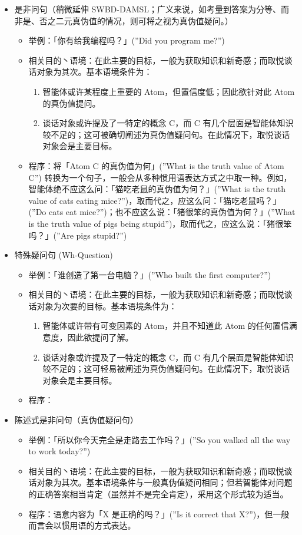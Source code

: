 \begin{itemize}


\item 是非问句（稍微延伸 SWBD-DAMSL；广义来说，如考量到答案为分等、而非是、否之二元真伪值的情况，则可将之视为真伪值疑问。）
\begin{itemize}
\item 举例：「你有给我编程吗？」(”Did you program me?”)
\item 相关目的丶语境：在此主要的目标，一般为获取知识和新奇感；而取悦谈话对象为其次。基本语境条件为：
\begin{enumerate}
\item 智能体或许某程度上重要的 Atom，但置信度低；因此欲针对此 Atom 的真伪值提问。
\item 谈话对象或许提及了一特定的概念 C，而 C 有几个层面是智能体知识较不足的；这可被确切阐述为真伪值疑问句。在此情况下，取悦谈话对象会是主要目标。
\end{enumerate}
\item 程序：将「Atom C 的真伪值为何」(”What is the truth value of Atom C”) 转换为一个句子，一般会从多种惯用语表达方式之中取一种。例如，智能体绝不应这么问：「猫吃老鼠的真伪值为何？」(”What is the truth value of cats eating mice?”)，取而代之，应这么问：「猫吃老鼠吗？」(”Do cats eat mice?”)；也不应这么说：「猪很笨的真伪值为何？」(”What is the truth value of pigs being stupid”)，取而代之，应这么说：「猪很笨吗？」(”Are pigs stupid?”)
\end{itemize}


\item 特殊疑问句 (Wh-Question)
\begin{itemize}
\item 举例：「谁创造了第一台电脑？」(”Who built the first computer?”)
\item 相关目的丶语境：在此主要的目标，一般为获取知识和新奇感；而取悦谈话对象为次要的目标。基本语境条件为：
\begin{enumerate}
\item 智能体或许带有可变因素的 Atom，并且不知道此 Atom 的任何置信满意度，因此欲提问了解。 
\item 谈话对象或许提及了一特定的概念 C，而 C 有几个层面是智能体知识较不足的；这可轻易被阐述为真伪值疑问句。在此情况下，取悦谈话对象会是主要目标。
\end{enumerate}
\item 程序：
\end{itemize}


\item 陈述式是非问句（真伪值疑问句）
\begin{itemize}
\item 举例：「所以你今天完全是走路去工作吗？」(”So you walked all the way to work today?”)
\item 相关目的丶语境：在此主要的目标，一般为获取知识和新奇感；而取悦谈话对象为其次。基本语境条件与一般真伪值疑问相同；但若智能体对问题的正确答案相当肯定（虽然并不是完全肯定），采用这个形式较为适当。 
\item 程序：语意内容为「X 是正确的吗？」(”Is it correct that X?”)，但一般而言会以惯用语的方式表达。
\end{itemize}



\end{itemize}
